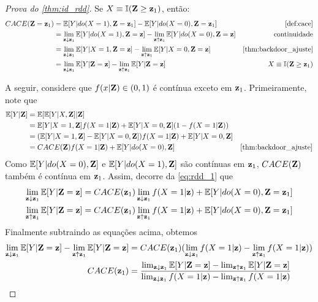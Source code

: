 \begin{proof}[Prova do \cref{thm:id_rdd}]
 Se $X \equiv {\mathbb I}({\mathbf{Z}} \geq {\mathbf{z}}_1)$, então:
 \begin{align*}
  \CACE(\Z=\z_1)
  &= \E[Y|do(X=1),\Z=\z_1] - \E[Y|do(X=0),\Z=\z_1] 
  & \text{\cref{def:cace}} \\
  &= \lim_{\z \downarrow \z_1} \E[Y|do(X=1),\Z=\z] 
  - \lim_{\z \uparrow \z_1}\E[Y|do(X=0),\Z=\z]
  & \text{continuidade} \\
  &= \lim_{\z \downarrow \z_1} \E[Y|X=1,\Z=\z] 
  - \lim_{\z \uparrow \z_1}\E[Y|X=0,\Z=\z]
  & \text{\cref{thm:backdoor_ajuste}} \\
  &= \lim_{\z \downarrow \z_1} \E[Y|\Z=\z] 
  - \lim_{\z \uparrow \z_1}\E[Y|\Z=\z]
  & X \equiv \I(\Z \geq \z_1)
 \end{align*}
 
 A seguir, considere que
 $f(x|{\mathbf{Z}}) \in (0,1)$ é contínua exceto em ${\mathbf{z}}_1$.
 Primeiramente, note que
 \begin{align}
  \label{eq:rdd_1}
  \E[Y|\Z] 
  &= \E[\E[Y|X,\Z]|\Z] \nonumber \\
  &= \E[Y|X=1,\Z]f(X=1|\Z) + \E[Y|X=0,\Z](1-f(X=1|\Z)) \nonumber \\
  &= (\E[Y|X=1,\Z]-\E[Y|X=0,\Z])f(X=1|\Z) + \E[Y|X=0,\Z] \nonumber \\
  &= \CACE(\Z)f(X=1|\Z) + \E[Y|do(X=0),\Z]
  & \text{\cref{thm:backdoor_ajuste}}
 \end{align}
 Como ${\mathbb E}[Y|do(X=0),{\mathbf{Z}}]$ e ${\mathbb E}[Y|do(X=1),{\mathbf{Z}}]$ são contínuas em ${\mathbf{z}}_1$,
 ${CACE}({\mathbf{Z}})$ também é contínua em ${\mathbf{z}}_1$. Assim, 
 decorre da \cref{eq:rdd_1} que
 \begin{align*}
  \lim_{{\mathbf{z}} \downarrow {\mathbf{z}}_1}{\mathbb E}[Y|{\mathbf{Z}}={\mathbf{z}}]
  &= {CACE}({\mathbf{z}}_1)\lim_{{\mathbf{z}} \downarrow {\mathbf{z}}_1} f(X=1|{\mathbf{z}}) + {\mathbb E}[Y|do(X=0),{\mathbf{Z}}={\mathbf{z}}_1] \\
  \lim_{{\mathbf{z}} \uparrow {\mathbf{z}}_1}{\mathbb E}[Y|{\mathbf{Z}}={\mathbf{z}}]
  &= {CACE}({\mathbf{z}}_1)\lim_{{\mathbf{z}} \uparrow {\mathbf{z}}_1} f(X=1|{\mathbf{z}}) + {\mathbb E}[Y|do(X=0),{\mathbf{Z}}={\mathbf{z}}_1] \\
 \end{align*}
 Finalmente subtraindo as equações acima, obtemos
 \begin{align*}
  \lim_{{\mathbf{z}} \downarrow {\mathbf{z}}_1}{\mathbb E}[Y|{\mathbf{Z}}={\mathbf{z}}] - \lim_{{\mathbf{z}} \uparrow {\mathbf{z}}_1}{\mathbb E}[Y|{\mathbf{Z}}={\mathbf{z}}]
  &= {CACE}({\mathbf{z}}_1)(\lim_{{\mathbf{z}} \downarrow {\mathbf{z}}_1} f(X=1|{\mathbf{z}}) - \lim_{{\mathbf{z}} \uparrow {\mathbf{z}}_1} f(X=1|{\mathbf{z}})) \\
  {CACE}({\mathbf{z}}_1) 
  &= \frac{\lim_{{\mathbf{z}} \downarrow {\mathbf{z}}_1}{\mathbb E}[Y|{\mathbf{Z}}={\mathbf{z}}] - \lim_{{\mathbf{z}} \uparrow {\mathbf{z}}_1}{\mathbb E}[Y|{\mathbf{Z}}={\mathbf{z}}]}
  {\lim_{{\mathbf{z}} \downarrow {\mathbf{z}}_1} f(X=1|{\mathbf{z}}) - \lim_{{\mathbf{z}} \uparrow {\mathbf{z}}_1} f(X=1|{\mathbf{z}})}
 \end{align*}
\end{proof}

